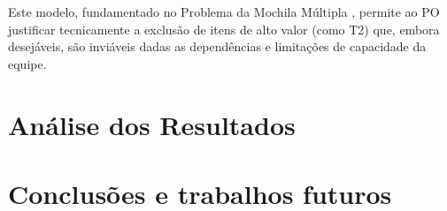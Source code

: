 \documentclass[12pt]{article}
\begin{document}
Este modelo, fundamentado no Problema da Mochila Múltipla \cite{kellerer2004}, permite ao PO justificar tecnicamente a exclusão de itens de alto valor (como T2) que, embora desejáveis, são inviáveis dadas as dependências e limitações de capacidade da equipe.



\section{Análise dos Resultados}

\section{Conclusões e trabalhos futuros}





\end{document}
